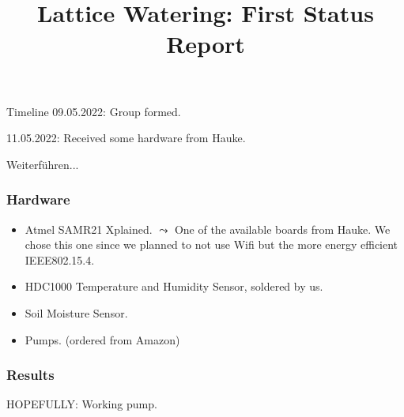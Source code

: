 \documentclass[10pt, xcolor=svgnames]{beamer}
\title{Lattice Watering: First Status Report}
\begin{document}
\maketitle

\begin{frame}{Timeline}
    09.05.2022: Group formed.

    11.05.2022: Received some hardware from Hauke.

    Weiterführen...
\end{frame}

\begin{frame}
    \frametitle{Hardware}

    \begin{itemize}
        \item Atmel SAMR21 Xplained. \(\leadsto\) One of the available boards from Hauke. We chose this one since we planned to not use Wifi but the more energy efficient IEEE802.15.4.
        \item HDC1000 Temperature and Humidity Sensor, soldered by us.
        \item Soil Moisture Sensor.
        \item Pumps. (ordered from Amazon)
    \end{itemize}
\end{frame}

\begin{frame}
    \frametitle{Results}

    HOPEFULLY: Working pump.
\end{frame}
\end{document}

